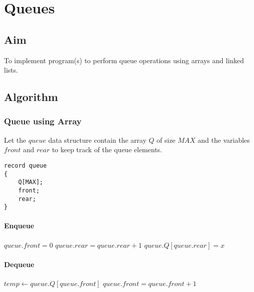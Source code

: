 \chapter{Queues}

\section{Aim}

{\Large\color{white}
To implement program(s) to perform queue operations using arrays and linked lists.
\color{black}}

\section{Algorithm}

\subsection{Queue using Array}

{\Large\color{white}
Let the $queue$ data structure contain the array $Q$ of size $MAX$ and the variables $front$ and $rear$ to keep track of the queue elements.
\begin{lstlisting}[style=myC]
record queue
{
	Q[MAX];
	front;
	rear;
}
\end{lstlisting}
\color{black}}

\subsubsection{Enqueue}
{\Large\color{white}
\begin{algorithmic}[1]
			\State {}
		\EndIf
			\State $queue.front = 0$
		\EndIf
		\State $queue.rear = queue.rear + 1$
		\State $queue.Q[queue.rear] = x$
	\EndFunction
\end{algorithmic}
\color{black}}

\subsubsection{Dequeue}
{\Large\color{white}
\begin{algorithmic}[1]
			\State {}
		\EndIf

		\State $temp \gets queue.Q[queue.front]$
		\State $queue.front = queue.front + 1$
		\State {}
	\EndFunction
\end{algorithmic}
\color{black}}

